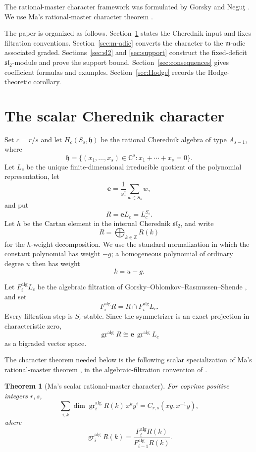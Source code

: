 \documentclass[11pt]{article}
\newtheorem{theorem}{Theorem}[section]
\newcommand{\C}{\mathbb{C}}
\newcommand{\Z}{\mathbb{Z}}
\newcommand{\gr}{\operatorname{gr}}
\newcommand{\e}{\mathbf e}
\newcommand{\alg}{\mathrm{alg}}
\begin{document}
The rational-master character framework was formulated by Gorsky and
Negu\c{t} \cite{GorskyNegut}.  We use Ma's rational-master character
theorem \cite{MaCuspidal}.

The paper is organized as follows.  Section~\ref{sec:Cherednik-input}
states the Cherednik input and fixes filtration conventions.
Section~\ref{sec:m-adic} converts the character to the
$\mathfrak m$-adic associated graded.  Sections~\ref{sec:sl2} and
\ref{sec:support} construct the fixed-deficit $\mathfrak{sl}_2$-module
and prove the support bound.  Section~\ref{sec:consequences} gives
coefficient formulas and examples.  Section~\ref{sec:Hodge} records
the Hodge-theoretic corollary.

\section{The scalar Cherednik character}\label{sec:Cherednik-input}

Set $c=r/s$ and let $H_c(S_s,\mathfrak h)$ be the rational Cherednik
algebra of type $A_{s-1}$, where
\[
 \mathfrak h
 =\{(x_1,\ldots,x_s)\in\C^s:x_1+\cdots+x_s=0\}.
\]
Let $L_c$ be the unique finite-dimensional irreducible quotient of the
polynomial representation, let
\[
 \e=\frac1{s!}\sum_{w\in S_s}w,
\]
and put
\[
 R=\e L_c=L_c^{S_s}.
\]
Let $h$ be the Cartan element in the internal Cherednik
$\mathfrak{sl}_2$, and write
\[
 R=\bigoplus_{k\in\Z}R(k)
\]
for the $h$-weight decomposition.  We use the standard normalization
in which the constant polynomial has weight $-g$; a homogeneous
polynomial of ordinary degree $u$ then has weight
\begin{equation}\label{eq:Euler-degree}
 k=u-g.
\end{equation}

Let $F_i^{\alg}L_c$ be the algebraic filtration of
Gorsky--Oblomkov--Rasmussen--Shende \cite{GORS}, and set
\[
 F_i^{\alg}R=R\cap F_i^{\alg}L_c.
\]
Every filtration step is $S_s$-stable.  Since the symmetrizer is an
exact projection in characteristic zero,
\[
 \gr^{\alg}R\cong \e\,\gr^{\alg}L_c
\]
as a bigraded vector space.

The character theorem needed below is the following scalar
specialization of Ma's rational-master theorem
\cite[Theorems~4.6 and~7.8 and Proposition~7.2]{MaCuspidal},
in the algebraic-filtration convention of \cite{GORS}.

\begin{theorem}[Ma's scalar rational-master character]
\label{thm:Ma-character}
For coprime positive integers $r,s$,
\begin{equation}\label{eq:Ma-character}
 \sum_{i,k}
 \dim\gr_i^{\alg}R(k)\,x^ky^i
 =C_{r,s}(xy,x^{-1}y),
\end{equation}
where
\[
 \gr_i^{\alg}R(k)
 =\frac{F_i^{\alg}R(k)}{F_{i-1}^{\alg}R(k)}.
\]
\end{theorem}
\end{document}
